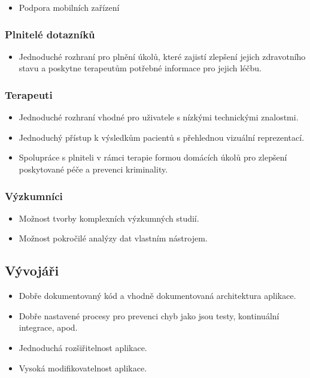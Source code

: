\begin{itemize}
    \item
    Podpora mobilních zařízení
\end{itemize}

\subsubsection*{Plnitelé dotazníků}\label{subsubsec:plnitele}

\begin{itemize}
    \item
    Jednoduché rozhraní pro plnění úkolů, které zajistí zlepšení jejich zdravotního stavu a poskytne terapeutům potřebné informace pro jejich léčbu.
\end{itemize}

\subsubsection*{Terapeuti}\label{subsubsec:terapeuti}

\begin{itemize}
    \item
    Jednoduché rozhraní vhodné pro uživatele s nízkými technickými znalostmi.
    \item
    Jednoduchý přístup k výsledkům pacientů s přehlednou vizuální reprezentací.
    \item
    Spolupráce s plniteli v rámci terapie formou domácích úkolů pro zlepšení poskytované péče a prevenci kriminality.
\end{itemize}

\subsubsection*{Výzkumníci}\label{subsubsec:vyzkumnici}

\begin{itemize}
    \item
    Možnost tvorby komplexních výzkumných studií.
    \item
    Možnost pokročilé analýzy dat vlastním nástrojem.
\end{itemize}

\subsection*{Vývojáři}\label{subsec:vyvojari}

\begin{itemize}
    \item
    Dobře dokumentovaný kód a vhodně dokumentovaná architektura aplikace.
    \item
    Dobře nastavené procesy pro prevenci chyb jako jsou testy, kontinuální integrace, apod.
    \item
    Jednoduchá rozšiřitelnost aplikace.
    \item
    Vysoká modifikovatelnost aplikace.
\end{itemize}

